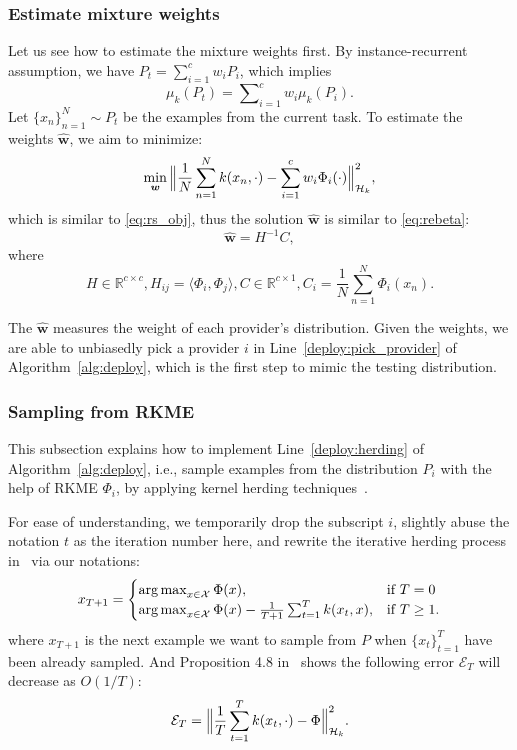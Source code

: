 \documentclass[paper=letter, fontsize=20pt]{article}
\newcommand*\argmax{\mathop{\arg \max}}
\begin{document}
\subsubsection{Estimate mixture weights}
Let us see how to estimate the mixture weights first. By instance-recurrent assumption, we have $P_t = \sum_{i=1}^c w_i P_i$, which implies 
\begin{equation}\label{eq:mixture_model}
\mu_k(P_t) = \sum\nolimits_{i=1}^c w_i \mu_k(P_i).
\end{equation}
Let $\{x_n\}_{n=1}^N\sim P_t$ be the examples from the current task. 
To estimate the weights $\widehat{\bm{w}}$, we aim to minimize:
\begin{equation*}\label{eq:mixture-dist-loss}
\min_{\bm{w}}\Big \lVert \frac{1}{N}\sum_{n=1}^N k(x_n,\cdot)- \sum_{i=1}^c w_i \Phi_i(\cdot) \Big \rVert^2_{\mathcal{H}_k},
\end{equation*}
which is similar to \eqref{eq:rs_obj}, thus the solution $\widehat{\bm{w}}$ is similar to \eqref{eq:rebeta}:
\begin{equation}\label{eq:w_solution}
\widehat{\bm{w}} = H^{-1}C,
\end{equation}
where
\begin{equation*}
  H\in \mathbb{R}^{c\times c},H_{ij}=\langle \Phi_i, \Phi_j\rangle, C\in \mathbb{R}^{c\times 1},C_i=\frac{1}{N}\sum_{n=1}^N \Phi_i(x_n).
\end{equation*}

The $\widehat{\bm{w}}$ measures the weight of each provider's distribution. Given the weights, we are able to unbiasedly pick a provider $i$ in Line~\ref{deploy:pick_provider} of Algorithm~\ref{alg:deploy}, which is the first step to mimic the testing distribution.

\subsubsection{Sampling from RKME}
This subsection explains how to implement Line~\ref{deploy:herding} of Algorithm~\ref{alg:deploy}, i.e., sample examples from the distribution $P_i$ with the help of RKME $\Phi_i$, by applying kernel herding techniques~\citep{kernel_herding}. 

For ease of understanding, we temporarily drop the subscript $i$, slightly abuse the notation $t$ as the iteration number here, and rewrite the iterative herding process in~\cite{herding_thesis} via our notations:
\begin{equation}\label{eq:herding_next}
x_{T+1}=\begin{cases}
\argmax_{x\in \X} \Phi(x), &\text{if $T=0$} \\
\argmax_{x\in \X} \Phi(x)-\frac{1}{T+1}\sum_{t=1}^{T}k(x_t,x), &\text{if $T\geq 1$}.
\end{cases}
\end{equation}
where $x_{T+1}$ is the next example we want to sample from $P$ when $\{x_t\}_{t=1}^T$ have been already sampled. And Proposition 4.8 in~\cite{herding_thesis} shows the following error $\mathcal{E}_T$ will decrease as $O(1/T)$:
\begin{equation*}
  \mathcal{E}_T=\Big\lVert \frac{1}{T}\sum_{t=1}^T k(x_t,\cdot) -\Phi\Big\rVert^2_{\mathcal{H}_k}.
\end{equation*}
\end{document}
